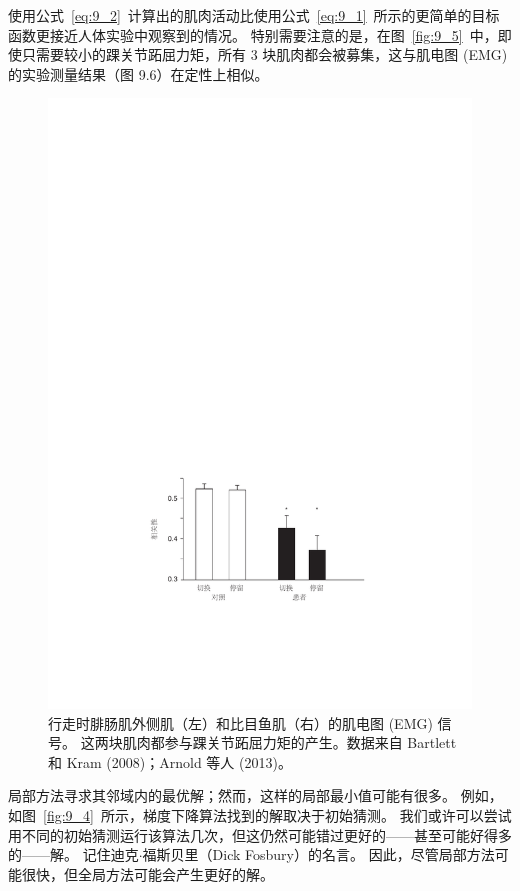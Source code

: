 使用公式~\ref{eq:9_2}~计算出的肌肉活动比使用公式~\ref{eq:9_1}~所示的更简单的目标函数更接近人体实验中观察到的情况。
特别需要注意的是，在图~\ref{fig:9_5}~中，即使只需要较小的踝关节跖屈力矩，所有 3 块肌肉都会被募集，这与肌电图 (EMG) 的实验测量结果（图 9.6）在定性上相似。


\begin{figure}[!htb]
	\centering
	\includegraphics[width=1.0\linewidth]{chap9/9_6}
	\caption{行走时腓肠肌外侧肌（左）和比目鱼肌（右）的肌电图 (EMG) 信号。
		这两块肌肉都参与踝关节跖屈力矩的产生。数据来自 Bartlett 和 Kram (2008)；Arnold 等人 (2013)。 \label{fig:9_6}}
\end{figure}


局部方法寻求其邻域内的最优解；然而，这样的局部最小值可能有很多。
例如，如图~\ref{fig:9_4}~所示，梯度下降算法找到的解取决于初始猜测。
我们或许可以尝试用不同的初始猜测运行该算法几次，但这仍然可能错过更好的——甚至可能好得多的——解。
记住迪克$\cdot$福斯贝里（Dick Fosbury）的名言。
因此，尽管局部方法可能很快，但全局方法可能会产生更好的解。



















